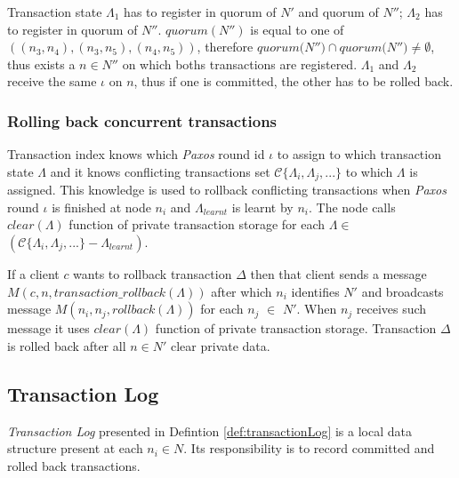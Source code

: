 \documentclass[runningheads,a4paper]{llncs}
\newcommand{\nodes}{$\mathit{N}$\xspace}
\newcommand{\nodesTx}{$\mathit{N'}$\xspace}
\newcommand{\transaction}{$\Delta$\xspace}
\newcommand{\txStates}{$\{\Lambda_{i}, \Lambda_{j}, ...\}$\xspace}
\newcommand{\txLog}{$\mathcal{L}$\xspace}
\newcommand{\conflictingTxSet}{$\mathcal{C}\text{\txStates}$\xspace}
\newcommand{\txRollbackMessage}{$\mathit{M}(c,n,\mathit{transaction\_rollback}(\Lambda))$\xspace}
\newcommand{\rollbackMessage}{$\mathit{M}(n_{i}, n_{j}, \mathit{rollback}(\Lambda))$\xspace}
\newcommand{\paxosRoundId}{$\iota$\xspace}
\newcommand{\txState}{$\Lambda$\xspace}
\newcommand{\txStatei}[1]{$\Lambda_{#1}$\xspace}
\newcommand{\txStateCommitted}{$\Lambda_{learnt}$\xspace}
\newcommand{\txIndex}{$\chi$\xspace}
\newcommand{\paxos}{\emph{Paxos}\xspace}
\newcommand{\mpt}{\emph{MPT}\xspace}
\newcommand{\client}{$c$\xspace}
\newcommand{\node}[1]{$n_{#1}$\xspace}
\begin{document}
Transaction state \txStatei{1} has to register in quorum of $N'$ and quorum of $N''$; \txStatei{2} has to register in quorum of $N''$. $quorum(N'')$ is equal to one of $((n_3,n_4),(n_3,n_5),(n_4,n_5))$, therefore $\mathit{quorum(N''}) \cap \mathit{quorum(N''}) \neq \emptyset$, thus exists a $n\in N''$ on which boths transactions are registered. \txStatei{1} and \txStatei{2} receive the same \paxosRoundId on $n$, thus if one is committed, the other has to be rolled back.

\subsubsection{Rolling back concurrent transactions}
Transaction index knows which \paxos round id \paxosRoundId to assign to which transaction state \txState and it knows conflicting transactions set \conflictingTxSet to which \txState is assigned. This knowledge is used to rollback conflicting transactions when \paxos round \paxosRoundId is finished at node \node{i} and \txStateCommitted is learnt by \node{i}. The node calls $\mathit{clear}(\text{\txState})$ function of private transaction storage for each \mbox{\txState $\in$ $(\text{\conflictingTxSet} - \text{\txStateCommitted})$}.

If a client \client wants to rollback transaction \transaction then that client sends a message \txRollbackMessage after which \node{i} identifies \nodesTx and broadcasts message \rollbackMessage for each \node{j} $\in$ \nodesTx. When \node{j} receives such message it uses $\mathit{clear}(\text{\txState})$ function of private transaction storage. Transaction \transaction is rolled back after all \mbox{$n\in \text{\nodesTx}$} clear private data.

\subsection{Transaction Log}
\label{sec:mpp:transactionLog}

\emph{Transaction Log} presented in Defintion \ref{def:transactionLog} is a local data structure present at each \node{i}$\in\text{\nodes}$. Its responsibility is to record committed and rolled back transactions. 

\end{document}
